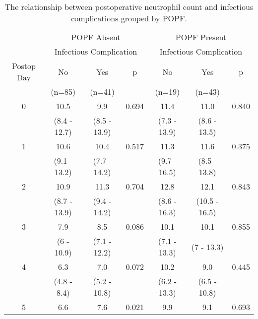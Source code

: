 \begin{table}[h]
	\centering
	\caption{The relationship between postoperative neutrophil count and infectious complications grouped by POPF.}
	\label{table:crp_comp_Neutrophil_vs_infections_popf_y1n0}
	\begin{tabular}{| c | c c c | c c c |}
		\hline
		           &       \multicolumn{3}{c|}{POPF Absent}       &      \multicolumn{3}{c|}{POPF Present}       \\
		           & \multicolumn{3}{c|}{Infectious Complication} & \multicolumn{3}{c|}{Infectious Complication} \\
		Postop Day & No           & Yes          & p             & No           & Yes           & p            \\
		           & (n=85)       & (n=41)       &               & (n=19)       & (n=43)        &  \\ \hline
		0          & 10.5         & 9.9          & 0.694         & 11.4         & 11.0          & 0.840 \\
		           & (8.4 - 12.7) & (8.5 - 13.9) &               & (7.3 - 13.9) & (8.6 - 13.5)  &  \\
		1          & 10.6         & 10.4         & 0.517         & 11.3         & 11.6          & 0.375 \\
		           & (9.1 - 13.2) & (7.7 - 14.2) &               & (9.7 - 16.5) & (8.5 - 13.8)  &  \\
		2          & 10.9         & 11.3         & 0.704         & 12.8         & 12.1          & 0.843 \\
		           & (8.7 - 13.9) & (9.4 - 14.2) &               & (8.6 - 16.3) & (10.5 - 16.5) &  \\
		3          & 7.9          & 8.5          & 0.086         & 10.1         & 10.1          & 0.855 \\
		           & (6 - 10.9)   & (7.1 - 12.2) &               & (7.1 - 13.3) & (7 - 13.3)    &  \\
		4          & 6.3          & 7.0          & 0.072         & 10.2         & 9.0           & 0.445 \\
		           & (4.8 - 8.4)  & (5.2 - 10.8) &               & (6.2 - 13.3) & (6.5 - 10.8)  &  \\
		5          & 6.6          & 7.6          & 0.021         & 9.9          & 9.1           & 0.693 \\

\end{tabular}
\end{table}
